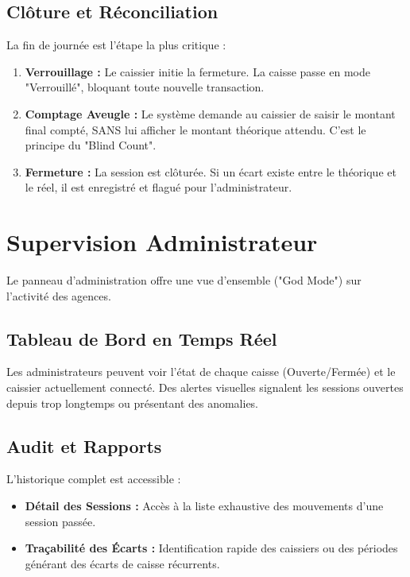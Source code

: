 \subsection{Clôture et Réconciliation}
La fin de journée est l'étape la plus critique :
\begin{enumerate}
    \item \textbf{Verrouillage :} Le caissier initie la fermeture. La caisse passe en mode "Verrouillé", bloquant toute nouvelle transaction.
    \item \textbf{Comptage Aveugle :} Le système demande au caissier de saisir le montant final compté, SANS lui afficher le montant théorique attendu. C'est le principe du "Blind Count".
    \item \textbf{Fermeture :} La session est clôturée. Si un écart existe entre le théorique et le réel, il est enregistré et flagué pour l'administrateur.
\end{enumerate}

\section{Supervision Administrateur}
Le panneau d'administration offre une vue d'ensemble ("God Mode") sur l'activité des agences.

\subsection{Tableau de Bord en Temps Réel}
Les administrateurs peuvent voir l'état de chaque caisse (Ouverte/Fermée) et le caissier actuellement connecté. Des alertes visuelles signalent les sessions ouvertes depuis trop longtemps ou présentant des anomalies.

\subsection{Audit et Rapports}
L'historique complet est accessible :
\begin{itemize}
    \item \textbf{Détail des Sessions :} Accès à la liste exhaustive des mouvements d'une session passée.
    \item \textbf{Traçabilité des Écarts :} Identification rapide des caissiers ou des périodes générant des écarts de caisse récurrents.
\end{itemize}
